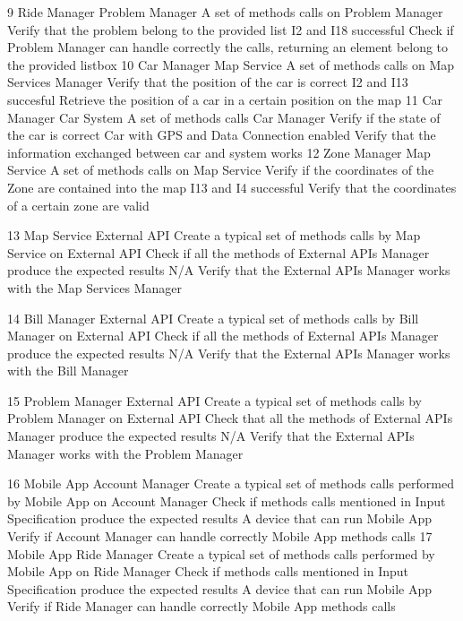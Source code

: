 \testCase
	{9}
	{Ride Manager}
	{Problem Manager}
	{A set of methods calls on Problem Manager}
	{Verify that the problem belong to the provided list}
	{I2 and I18 successful}
	{Check if Problem Manager can handle correctly the calls, returning an element belong to the provided listbox}
\testCase
	{10}
	{Car Manager}
	{Map Service}
	{A set of methods calls on Map Services Manager}
	{Verify that the position of the car is correct}
	{I2 and I13 succesful}
	{Retrieve the position of a car in a certain position on the map}
\testCase
	{11}
	{Car Manager}
	{Car System}
	{A set of methods calls Car Manager}
	{Verify if the state of the car is correct}
	{Car with GPS and Data Connection enabled}
	{Verify that the information exchanged between car and system works}
\testCase
	{12}
	{Zone Manager}
	{Map Service}
	{A set of methods calls on Map Service}
	{Verify if the coordinates of the Zone are contained into the map}
	{I13 and I4 successful}
	{Verify that the coordinates of a certain zone are valid}

\testCase
	{13}
	{Map Service}
	{External API}
	{Create a typical set of methods calls by Map Service on External API}
	{Check if all the methods of External  APIs Manager produce the expected results}
	{N/A}
	{Verify that the External APIs Manager works  with the Map Services Manager}

\testCase
	{14}
	{Bill Manager}
	{External API}
	{Create a typical set of methods calls by Bill Manager on External API}
	{Check if all the methods of External   APIs Manager produce the expected results}
	{N/A}
	{Verify that the External APIs Manager works  with the Bill Manager}

\testCase
	{15}
	{Problem Manager}
	{External API}
	{Create a typical set of methods calls by Problem Manager on External API}
	{Check that all the methods of External   APIs Manager produce the expected results}
	{N/A}
	{Verify that the External APIs Manager works  with the Problem Manager}

\testCase
	{16}
	{Mobile App}
	{Account Manager}
	{Create a typical set of methods calls performed by Mobile App on Account Manager}
	{Check if methods calls mentioned in Input Specification produce the expected results}
	{A device that can run Mobile App}
	{Verify  if Account Manager can handle correctly Mobile App methods calls}
\testCase
	{17}
	{Mobile App}
	{Ride Manager}
	{Create a typical set of methods calls performed by Mobile App on Ride Manager}
	{Check if methods calls mentioned in Input Specification produce the expected results}
	{A device that can run Mobile App}
	{Verify  if Ride Manager can handle correctly Mobile App methods calls}

